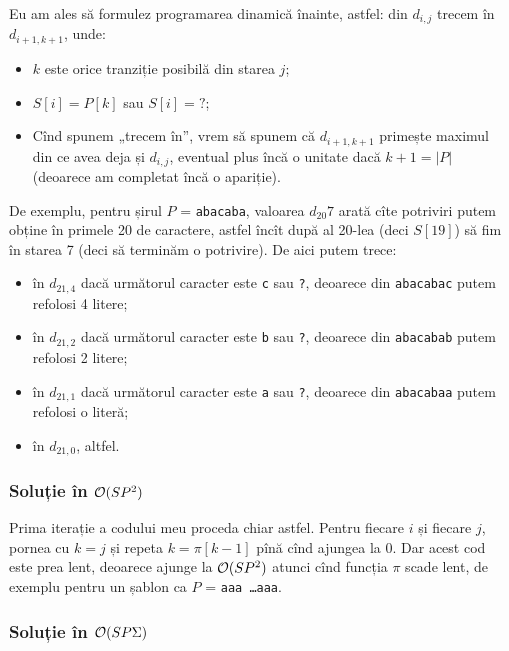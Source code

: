 \documentclass[../main.tex]{subfiles}
\begin{document}
Eu am ales să formulez programarea dinamică înainte, astfel: din $d_{i,j}$ trecem în $d_{i+1,k+1}$, unde:

\begin{itemize}
  \item $k$ este orice tranziție posibilă din starea $j$;

  \item $S[i] = P[k]$ sau $S[i] = \texttt{?}$;

  \item Cînd spunem „trecem în”, vrem să spunem că $d_{i+1,k+1}$ primește maximul din ce avea deja și $d_{i,j}$, eventual plus încă o unitate dacă $k +1 = |P|$ (deoarece am completat încă o apariție).
\end{itemize}

De exemplu, pentru șirul $P$ = \texttt{abacaba}, valoarea $d_{20}{7}$ arată cîte potriviri putem obține în primele 20 de caractere, astfel încît după al 20-lea (deci $S[19]$) să fim în starea 7 (deci să terminăm o potrivire). De aici putem trece:

\begin{itemize}
  \item în $d_{21,4}$ dacă următorul caracter este \texttt{c} sau \texttt{?}, deoarece din \texttt{abacabac} putem refolosi 4 litere;

  \item în $d_{21,2}$ dacă următorul caracter este \texttt{b} sau \texttt{?}, deoarece din \texttt{abacabab} putem refolosi 2 litere;

  \item în $d_{21,1}$ dacă următorul caracter este \texttt{a} sau \texttt{?}, deoarece din \texttt{abacabaa} putem refolosi o literă;

  \item în $d_{21,0}$, altfel.
\end{itemize}

\subsubsection*{Soluție în \texorpdfstring{$\mathcal{O}(SP^2)$}{O(SP2)}}

Prima iterație a codului meu proceda chiar astfel. Pentru fiecare $i$ și fiecare $j$, pornea cu $k = j$ și repeta $k = \pi[k - 1]$ pînă cînd ajungea la 0. Dar acest cod este prea lent, deoarece ajunge la $\mathcal{O}(SP^2)$ atunci cînd funcția $\pi$ scade lent, de exemplu pentru un șablon ca $P$ = \texttt{aaa \dots aaa}.

\subsubsection*{Soluție în \texorpdfstring{$\mathcal{O}(SP\Sigma)$}{SP Sigma}}
\end{document}
